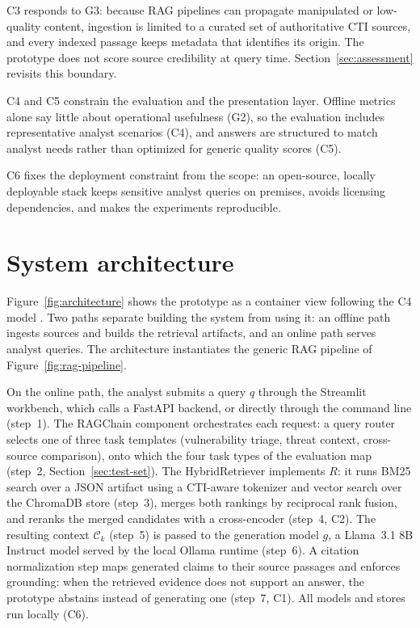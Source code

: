 C3 responds to G3: because RAG pipelines can propagate manipulated or
low-quality content, ingestion is limited to a curated set of
authoritative CTI sources, and every indexed passage keeps metadata that
identifies its origin. The prototype does not score source credibility at
query time. Section~\ref{sec:assessment} revisits this boundary.

C4 and C5 constrain the evaluation and the presentation layer. Offline
metrics alone say little about operational usefulness (G2), so the
evaluation includes representative analyst scenarios (C4), and answers are
structured to match analyst needs rather than optimized for generic
quality scores (C5).

C6 fixes the deployment constraint from the scope: an open-source, locally
deployable stack keeps sensitive analyst queries on premises, avoids
licensing dependencies, and makes the experiments reproducible.

\section{System architecture}
\label{sec:architecture}
\enlargethispage{2\baselineskip}

Figure~\ref{fig:architecture} shows the prototype as a container view
following the C4 model \parencite{brown2018c4}. Two paths separate
building the system from using it: an offline path ingests sources and
builds the retrieval artifacts, and an online path serves analyst queries.
The architecture instantiates the generic RAG pipeline of
Figure~\ref{fig:rag-pipeline}.

On the online path, the analyst submits a query $q$ through the Streamlit
workbench, which calls a FastAPI backend, or directly through the command
line (step~1). The RAGChain component orchestrates each request: a query
router selects one of three task templates (vulnerability triage, threat
context, cross-source comparison), onto which the four task types of the
evaluation map (step~2, Section~\ref{sec:test-set}). The
HybridRetriever implements $R$: it runs BM25 search over a JSON artifact
using a CTI-aware tokenizer and vector search over the ChromaDB store
(step~3), merges both rankings by reciprocal rank fusion, and reranks the
merged candidates with a cross-encoder (step~4, C2). The resulting context
$\mathcal{C}_k$ (step~5) is passed to the generation model $g$, a
Llama~3.1 8B Instruct model served by the local Ollama runtime (step~6). A
citation normalization step maps generated claims to their source passages
and enforces grounding: when the retrieved evidence does not support an
answer, the prototype abstains instead of generating one (step~7, C1). All
models and stores run locally (C6).

